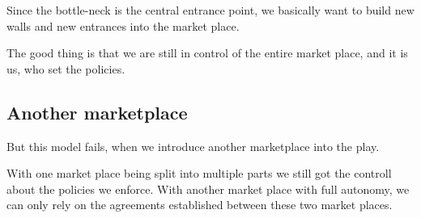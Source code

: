 \documentclass[10pt]{article}
\begin{document}
Since the bottle-neck is the central entrance point, we basically want to build
new walls and new entrances into the market place.

The good thing is that we are still in control of the entire market place, and
it is us, who set the policies.

\subsection{Another marketplace}

But this model fails, when we introduce another marketplace into the play.

With one market place being split into multiple parts we still got the controll about the policies we enforce.
With another market place with full autonomy, we can only rely on the agreements established between these two market places.
\end{document}

